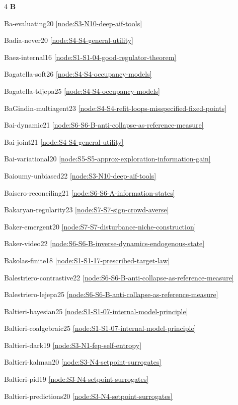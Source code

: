 \documentclass[10pt]{article}
\begin{document}
{\begin{multicols}{4}
\smallskip\textbf{B}\par
Ba-evaluating20 \hfill \ref{node:S3-N10-deep-aif-tools}\par
Badia-never20 \hfill \ref{node:S4-S4-general-utility}\par
Baez-internal16 \hfill \ref{node:S1-S1-04-good-regulator-theorem}\par
Bagatella-soft26 \hfill \ref{node:S4-S4-occupancy-models}\par
Bagatella-tdjepa25 \hfill \ref{node:S4-S4-occupancy-models}\par
BaGindin-multiagent23 \hfill \ref{node:S4-S4-refit-loops-misspecified-fixed-points}\par
Bai-dynamic21 \hfill \ref{node:S6-S6-B-anti-collapse-as-reference-measure}\par
Bai-joint21 \hfill \ref{node:S4-S4-general-utility}\par
Bai-variational20 \hfill \ref{node:S5-S5-approx-exploration-information-gain}\par
Baioumy-unbiased22 \hfill \ref{node:S3-N10-deep-aif-tools}\par
Baisero-reconciling21 \hfill \ref{node:S6-S6-A-information-states}\par
Bakaryan-regularity23 \hfill \ref{node:S7-S7-sign-crowd-averse}\par
Baker-emergent20 \hfill \ref{node:S7-S7-disturbance-niche-construction}\par
Baker-video22 \hfill \ref{node:S6-S6-B-inverse-dynamics-endogenous-state}\par
Bakolas-finite18 \hfill \ref{node:S1-S1-17-prescribed-target-law}\par
Balestriero-contrastive22 \hfill \ref{node:S6-S6-B-anti-collapse-as-reference-measure}\par
Balestriero-lejepa25 \hfill \ref{node:S6-S6-B-anti-collapse-as-reference-measure}\par
Baltieri-bayesian25 \hfill \ref{node:S1-S1-07-internal-model-principle}\par
Baltieri-coalgebraic25 \hfill \ref{node:S1-S1-07-internal-model-principle}\par
Baltieri-dark19 \hfill \ref{node:S3-N1-fep-self-entropy}\par
Baltieri-kalman20 \hfill \ref{node:S3-N4-setpoint-surrogates}\par
Baltieri-pid19 \hfill \ref{node:S3-N4-setpoint-surrogates}\par
Baltieri-predictions20 \hfill \ref{node:S3-N4-setpoint-surrogates}\par

\end{multicols}}
\end{document}
